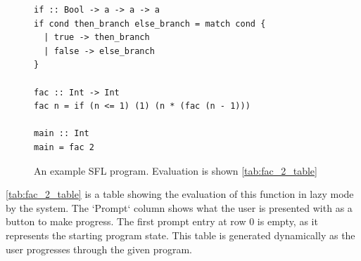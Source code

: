 \begin{figure}[h]
\begin{lstlisting}[language=SFL]
if :: Bool -> a -> a -> a
if cond then_branch else_branch = match cond {
  | true -> then_branch
  | false -> else_branch
}

fac :: Int -> Int
fac n = if (n <= 1) (1) (n * (fac (n - 1)))

main :: Int
main = fac 2
\end{lstlisting}
\caption{An example SFL program. Evaluation is shown \ref{tab:fac_2_table}}
\label{tab:fac_2_table_input}
\end{figure}

\ref{tab:fac_2_table} is a table showing the evaluation of this function in lazy mode by the system. The `Prompt` column shows what the user is presented with as a button to make progress. The first prompt entry at row $0$ is empty, as it represents the starting program state. This table is generated dynamically as the user progresses through the given program.  


